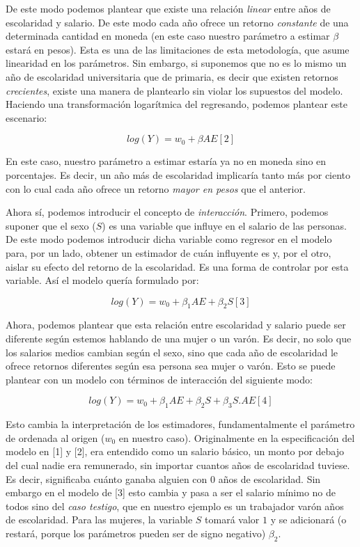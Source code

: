 De este modo podemos plantear que existe una relación \textit{linear} entre años de escolaridad y salario. De este modo cada año ofrece un retorno \textit{constante} de una determinada cantidad en moneda (en este caso nuestro parámetro a estimar $\beta$ estará en pesos). Esta es una de las limitaciones de esta metodología, que asume linearidad en los parámetros. Sin embargo, si suponemos que no es lo mismo un año de escolaridad universitaria que de primaria, es decir que existen retornos \textit{crecientes}, existe una manera de plantearlo sin violar los supuestos del modelo. Haciendo una transformación logarítmica del regresando, podemos plantear este escenario:

$$log(Y) = w_0 + \beta AE [2]$$

En este caso, nuestro parámetro a estimar estaría ya no en moneda sino en porcentajes. Es decir, un año más de escolaridad implicaría tanto más por ciento con lo cual cada año ofrece un retorno \textit{mayor en pesos} que el anterior.




Ahora sí, podemos introducir el concepto de \textit{interacción}. Primero, podemos suponer que el sexo ($S$) es una variable que influye en el salario de las personas. De este modo podemos introducir dicha variable como regresor en el modelo para, por un lado, obtener un estimador de cuán influyente es y, por el otro, aislar su efecto del retorno de la escolaridad. Es una forma de controlar por esta variable. Así el modelo quería formulado por:
 
$$log(Y) = w_0 + \beta_1 AE + \beta_2 S [3]$$



Ahora, podemos plantear que esta relación entre escolaridad y salario puede ser diferente según estemos hablando de una mujer o un varón. Es decir, no solo que los salarios medios cambian según el sexo, sino que cada año de escolaridad le ofrece retornos diferentes según esa persona sea mujer o varón. Esto se puede plantear con un modelo con términos de interacción del siguiente modo:

$$log(Y) = w_0 + \beta_1 AE + \beta_2 S + \beta_3  S.AE [4] $$



Esto cambia la interpretación de los estimadores, fundamentalmente el parámetro de ordenada al origen ($w_0$ en nuestro caso). Originalmente en la especificación del modelo en [1] y [2], era entendido como un salario básico, un monto por debajo del cual nadie era remunerado, sin importar cuantos años de escolaridad tuviese. Es decir, significaba cuánto ganaba alguien con 0 años de escolaridad. Sin embargo en el modelo  de [3] esto cambia y pasa a ser el salario mínimo no de todos sino del \textit{caso testigo}, que en nuestro ejemplo es un trabajador varón años de escolaridad. Para las mujeres, la variable $S$ tomará valor $1$ y se adicionará (o restará, porque los parámetros pueden ser de signo negativo) $\beta_2$. 

